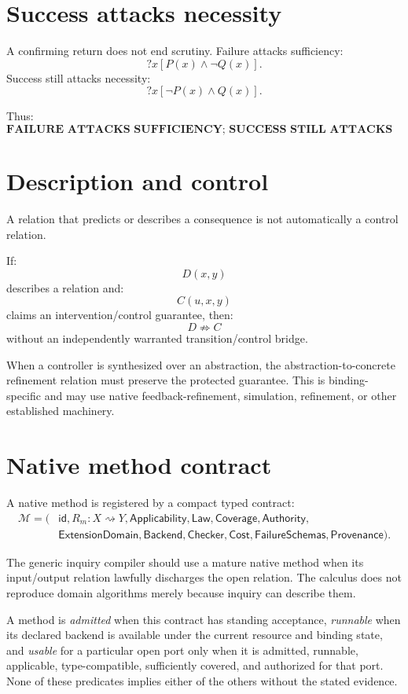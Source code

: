 \documentclass[11pt,oneside]{article}
\begin{document}
\section{Success attacks necessity}

A confirming return does not end scrutiny.  Failure attacks sufficiency:
\[
?x[P(x)\land\neg Q(x)].
\]
Success still attacks necessity:
\[
?x[\neg P(x)\land Q(x)].
\]

Thus:
\[
\boxed{
\textbf{FAILURE ATTACKS SUFFICIENCY;
SUCCESS STILL ATTACKS NECESSITY.}
}
\]

\section{Description and control}

A relation that predicts or describes a consequence is not automatically a control relation.

If:
\[
D(x,y)
\]
describes a relation and:
\[
C(u,x,y)
\]
claims an intervention/control guarantee, then:
\[
\boxed{
D\not\Rightarrow C
}
\]
without an independently warranted transition/control bridge.

When a controller is synthesized over an abstraction, the abstraction-to-concrete refinement relation must preserve the protected guarantee.  This is binding-specific and may use native feedback-refinement, simulation, refinement, or other established machinery.

\section{Native method contract}

A native method is registered by a compact typed contract:
\[
\boxed{
\begin{aligned}
\mathcal M=(
&\mathsf{id},R_m:X\rightsquigarrow Y,
\mathsf{Applicability},\mathsf{Law},\mathsf{Coverage},\mathsf{Authority},\\
&\mathsf{ExtensionDomain},\mathsf{Backend},\mathsf{Checker},\mathsf{Cost},
\mathsf{FailureSchemas},\mathsf{Provenance}).
\end{aligned}
}
\]

The generic inquiry compiler should use a mature native method when its input/output relation lawfully discharges the open relation.  The calculus does not reproduce domain algorithms merely because inquiry can describe them.

A method is \emph{admitted} when this contract has standing acceptance, \emph{runnable}
when its declared backend is available under the current resource and binding state,
and \emph{usable} for a particular open port only when it is admitted, runnable,
applicable, type-compatible, sufficiently covered, and authorized for that port.
None of these predicates implies either of the others without the stated evidence.
\end{document}
